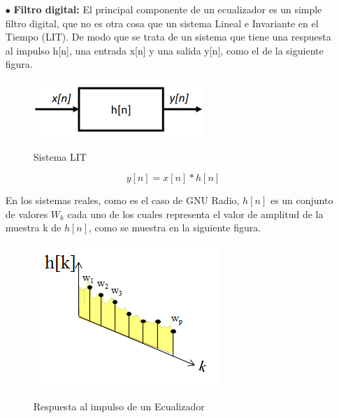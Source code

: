 \begin{itemize}
	\item [$\bullet$]\textbf{Filtro digital:} El principal componente de un ecualizador es un simple filtro digital, que no es otra cosa que un sistema Lineal e Invariante en el Tiempo (LIT). De modo que se trata de un sistema que tiene una respuesta al impulso h[n], una entrada x[n] y una salida y[n], como el de la siguiente figura. \\
	
	\begin{figure}[h!]
		\captionsetup{justification = raggedright, singlelinecheck = false}
		\caption{Sistema LIT} 
		\centering
		\includegraphics[scale=1]{Imagenes/Diagrama-trans.png}
		\label{fig:Diagrama-trans}
	\end{figure}

\begin{equation} \label{capcuatro_treintatres}
	 y[n]= x[n]*h[n]
\end{equation}

En los sistemas reales, como es el caso de GNU Radio, $h[n]$ es un conjunto de valores $W_k$ cada uno de los cuales representa el valor de amplitud de la muestra k de $h[n]$, como se muestra en la siguiente figura. \\

\begin{figure}[h!]
	\captionsetup{justification = raggedright, singlelinecheck = false}
	\caption{Respuesta al impulso de un Ecualizador} 
	\centering
	\includegraphics[scale=1]{Imagenes/Muestras.png}
	\label{fig:Muestras}
\end{figure}


\end{itemize}
